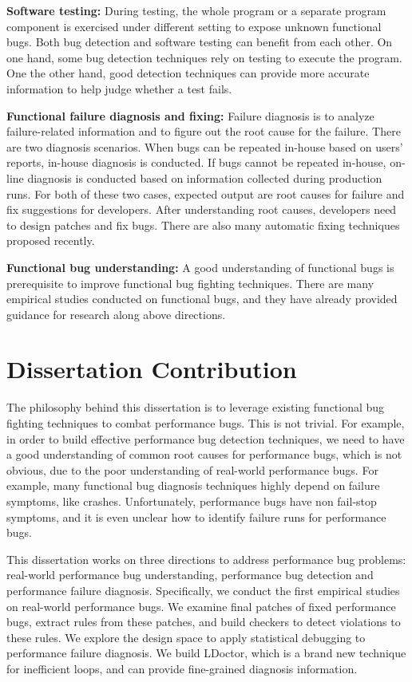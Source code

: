 {\bf Software testing:}
During testing, the whole program or a separate program component
is exercised under different setting to expose unknown functional bugs.
Both bug detection and software testing can benefit from each other.
On one hand, some bug detection techniques rely on testing to execute the program.
One the other hand, good detection techniques can provide more accurate information
to help judge whether a test fails.

{\bf Functional failure diagnosis and fixing:}
Failure diagnosis is to analyze failure-related information
and to figure out the root cause for the failure.
There are two diagnosis scenarios.
When bugs can be repeated in-house based on users' reports, in-house diagnosis is conducted.
If bugs cannot be repeated in-house,
on-line diagnosis is conducted based on information collected during production runs.
For both of these two cases,
expected output are root causes for failure and fix suggestions for developers.
After understanding root causes,
developers need to design patches and fix bugs.
There are also many automatic fixing techniques proposed recently.

{\bf Functional bug understanding:}
A good understanding of functional bugs is prerequisite
to improve functional bug fighting techniques.
There are many empirical studies conducted on functional bugs,
and they have already provided guidance for research along above directions.

\section{Dissertation Contribution}
The philosophy behind this dissertation is to leverage existing functional bug fighting 
techniques to combat performance bugs. This is not trivial.
For example, in order to build effective performance bug detection techniques,
we need to have a good understanding of common root causes for performance bugs, 
which is not obvious, due to the poor understanding of real-world performance bugs.
For example, many functional bug diagnosis techniques highly depend on failure symptoms, like crashes. 
Unfortunately, performance bugs have non fail-stop symptoms, and it is even unclear how to identify failure runs for performance bugs. 

This dissertation works on three directions to address performance bug problems:
real-world performance bug understanding, 
performance bug detection and performance failure diagnosis. 
Specifically, we conduct the first empirical studies on real-world performance bugs. 
We examine final patches of fixed performance bugs, extract rules from these patches, 
and build checkers to detect violations to these rules. 
We explore the design space to apply statistical debugging to performance failure diagnosis. 
We build LDoctor, which is a brand new technique for inefficient loops, 
and can provide fine-grained diagnosis information. 

